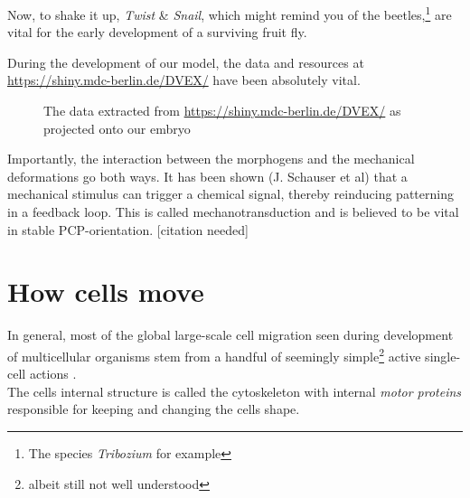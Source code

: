 \noindent
Now, to shake it up, \textit{Twist} \& \textit{Snail}, which might remind you of the beetles,\footnote{The species \textit{Tribozium} for example\cite{sommer1994expression}} are vital for the early development of a surviving fruit fly.


During the development of our model, the data and resources at \url{https://shiny.mdc-berlin.de/DVEX/} have been absolutely vital. 

\begin{figure}[H]
    \centering
    \caption{The data extracted from \url{https://shiny.mdc-berlin.de/DVEX/} as projected onto our embryo}
    \label{fig:enter-label}
\end{figure}

Importantly, the interaction between the morphogens and the mechanical deformations go both ways. It has been shown (J. Schauser et al) that a mechanical stimulus can trigger a chemical signal, thereby reinducing patterning in a feedback loop. This is called mechanotransduction and is believed to be vital in stable PCP-orientation. [citation needed]


\section{How cells move}

In general, most of the global large-scale cell migration seen during development of multicellular organisms stem from a handful of seemingly simple\footnote{albeit still not well understood} active single-cell actions \cite{walck2014cell}.\\
The cells internal structure is called the cytoskeleton with internal \textit{motor proteins} responsible for keeping and changing the cells shape.

